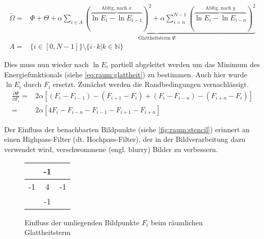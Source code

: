 \begin{align}
\label{eq:raum:glattheit}
\tilde{\Omega} =& 
    \Phi + \Theta +
    \underbrace{
        \alpha \sum_{i\in A}
            (\overbrace{
                \ln E_i - \ln E_{i-1}
            }^{\mbox{Abltg. nach }x}
        )^2
        +\alpha \sum_{i=n}^{N-1}(
            \overbrace{
                \ln E_i - \ln E_{i-n}
            }^{\mbox{Abltg. nach }y}
        )^2
    }_{\mbox{Glattheitsterm }\Psi}\\
    \label{eq:raum:x}
    A=& \{ i \in [0,N-1]\} \setminus \{ i \cdot k | k \in \mathbb{N} \}
\end{align}

Dies muss nun wieder nach $\ln E_i$ partiell abgeleitet werden um das Minimum des Energiefunktionals (siehe \autoref{eq:raum:glattheit}) zu bestimmen. Auch hier wurde $\ln E_i$ durch $F_i$ ersetzt. Zunächst werden die Randbedingungen vernachlässigt.
\begin{align}
\label{eq:raum:derivate}
\frac{\partial \Psi}{\partial F_i} =& 2\alpha[(F_i - F_{i-1}) - (F_{i+1} - F_i) + (F_i - F_{i-n})-(F_{i+n}- F_i)]\\
=&2\alpha[4 F_i-F_{i-n} - F_{i-1} - F_{i+1} - F_{i+n}]
\end{align}


Der Einfluss der benachbarten Bildpunkte (siehe \autoref{fig:raum:stencil}) erinnert an einen Highpass-Filter (dt. Hochpass-Filter), der in der Bildverarbeitung dazu verwendet wird, verschwommene (engl. blurry) Bilder zu verbessern.

\begin{figure}
  \begin{center}
    \begin{tabular}{c|c|c}
        \cline{2-2}
        & -1 & \\
        \hline
        \multicolumn{1}{|c|}{-1}
        & 4 & \multicolumn{1}{c|}{-1}\\
        \hline
        & -1 & \\
        \cline{2-2} 
    \end{tabular}
  \end{center}
\caption{Einfluss der umliegenden Bildpunkte $F_i$ beim räumlichen Glattheitsterm}
\label{fig:raum:stencil}
\end{figure}

